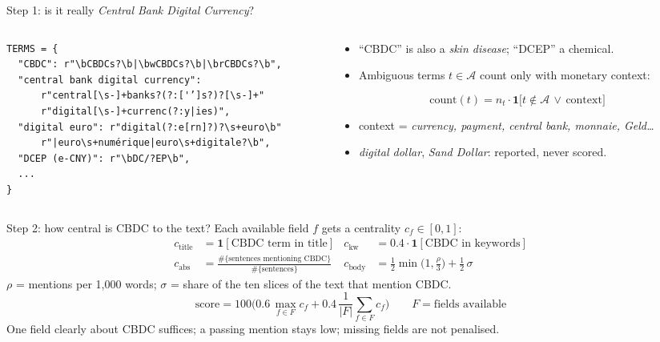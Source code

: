 \documentclass[aspectratio=169,10pt]{beamer}
\begin{document}
\begin{frame}[fragile]{Step 1: is it really \emph{Central Bank Digital Currency}?}
\begin{columns}[T]
\begin{column}{0.5\textwidth}
\begin{lstlisting}
TERMS = {
  "CBDC": r"\bCBDCs?\b|\bwCBDCs?\b|\brCBDCs?\b",
  "central bank digital currency":
      r"central[\s-]+banks?(?:['’]s?)?[\s-]+"
      r"digital[\s-]+currenc(?:y|ies)",
  "digital euro": r"digital(?:e[rn]?)?\s+euro\b"
      r"|euro\s+numérique|euro\s+digitale?\b",
  "DCEP (e-CNY)": r"\bDC/?EP\b",
  ...
}
\end{lstlisting}
\end{column}
\begin{column}{0.47\textwidth}\small
\begin{itemize}
\item ``CBDC'' is also a \emph{skin disease}; ``DCEP'' a chemical.
\item Ambiguous terms $t\in\mathcal{A}$ count only with \alert{monetary context}:
\end{itemize}
\[
\text{count}(t) = n_t \cdot \mathbf{1}\big[t \notin \mathcal{A} \,\lor\, \text{context}\big]
\]
\begin{itemize}
\item context = \emph{currency, payment, central bank, monnaie, Geld\dots}
\item \emph{digital dollar}, \emph{Sand Dollar}: reported, never scored.
\end{itemize}
\end{column}
\end{columns}
\end{frame}

\begin{frame}{Step 2: how central is CBDC to the text?}
Each available field $f$ gets a centrality $c_f \in [0,1]$:
\begin{align*}
c_{\text{title}} &= \mathbf{1}[\text{CBDC term in title}] &
c_{\text{kw}} &= 0.4\cdot\mathbf{1}[\text{CBDC in keywords}]\\
c_{\text{abs}} &= \frac{\#\{\text{sentences mentioning CBDC}\}}{\#\{\text{sentences}\}} &
c_{\text{body}} &= \tfrac12\min\!\Big(1,\frac{\rho}{3}\Big) + \tfrac12\,\sigma
\end{align*}
$\rho$ = mentions per 1{,}000 words; $\sigma$ = share of the ten slices of the text that mention CBDC.
\[
\boxed{\text{score} = 100\Big(0.6\,\max_{f\in F} c_f + 0.4\,\frac{1}{|F|}\sum_{f\in F} c_f\Big)}
\qquad F = \text{fields available}
\]
\small One field clearly about CBDC suffices; a passing mention stays low; missing fields are not penalised.
\end{frame}
\end{document}
